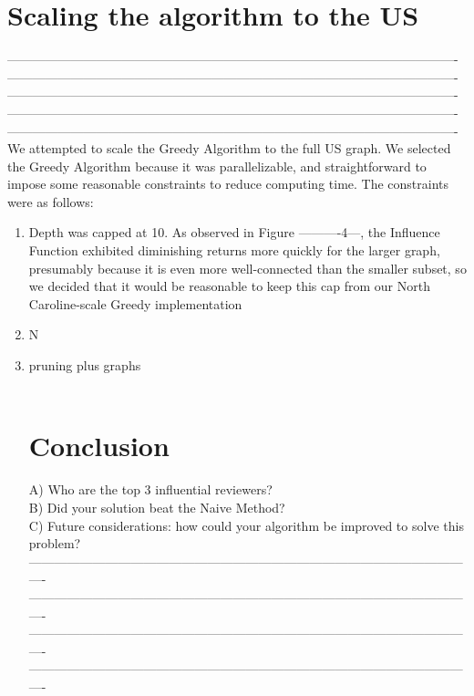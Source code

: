 \documentclass[11pt]{scrartcl} %
\begin{document}
\section{Scaling the algorithm to the US}
----------------------------------------------------------------------------------------------------------\\
----------------------------------------------------------------------------------------------------------\\
----------------------------------------------------------------------------------------------------------\\
----------------------------------------------------------------------------------------------------------\\
----------------------------------------------------------------------------------------------------------\\
We attempted to scale the Greedy Algorithm to the full US graph.  We selected the Greedy Algorithm because it was parallelizable, and straightforward to impose some reasonable constraints to reduce computing time.  The constraints were as follows:
\begin{enumerate}[1)]
\item
Depth was capped at 10.  As observed in Figure ----------4---, the Influence Function exhibited diminishing returns more quickly for the larger graph, presumably because it is even more well-connected than the smaller subset, so we decided that it would be reasonable to keep this cap from our North Caroline-scale Greedy implementation
\item
N
\item
pruning plus graphs
\\
\\
\section{Conclusion}
A) Who are the top 3 influential reviewers?\\
B) Did your solution beat the Naive Method?\\
C) Future considerations: how could your algorithm be improved to solve this problem?\\
----------------------------------------------------------------------------------------------------------\\
----------------------------------------------------------------------------------------------------------\\
----------------------------------------------------------------------------------------------------------\\
----------------------------------------------------------------------------------------------------------\\
%
%




\end{enumerate}
\end{document}
